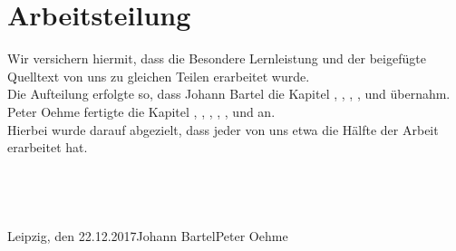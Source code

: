 \chapter{Arbeitsteilung}
Wir versichern hiermit, dass die Besondere Lernleistung und der beigefügte Quelltext von uns zu gleichen Teilen erarbeitet wurde. \\
Die Aufteilung erfolgte so, dass Johann Bartel die Kapitel , , , ,  und  übernahm. \\
Peter Oehme fertigte die Kapitel , , , , ,  und  an. \\
Hierbei wurde darauf abgezielt, dass jeder von uns etwa die Hälfte der Arbeit erarbeitet hat. \\\\\\\\\\
Leipzig, den 22.12.2017\tab Johann Bartel\tab \tab Peter Oehme